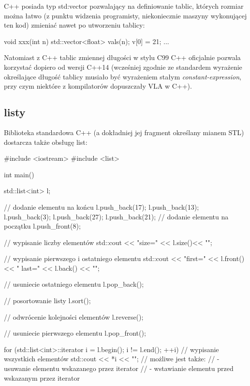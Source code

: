 \documentclass{pdfBooklets}
\begin{document}
C++ posiada typ std:vector pozwalający na definiowanie tablic, których rozmiar można łatwo (z punktu widzenia programisty, niekoniecznie maszyny wykonującej ten kod) zmieniać nawet po utworzeniu tablicy:
\begin{CodeFrame*}[cpp]{}
void xxx(int n) {
    std::vector<float> vals(n);
    v[0] = 21;
    ...
}
\end{CodeFrame*}

Natomiast z C++ tablic zmiennej długości w stylu C99 C++ oficjalnie pozwala korzystać dopiero od wersji C++14 (wcześniej zgodnie ze standardem wyrażenie określające długość tablicy musiało być wyrażeniem stałym \textit{constant-expression}, przy czym niektóre z kompilatorów dopuszczały VLA w C++).

\subsection{listy}

Biblioteka standardowa C++ (a dokładniej jej fragment określany mianem STL) dostarcza także obsługę list:

\begin{CodeFrame*}[cpp]{}
#include <iostream>
#include <list>

int main() {
    std::list<int> l;
    
    // dodanie elementu na końcu
    l.push_back(17);
    l.push_back(13);
    l.push_back(3);
    l.push_back(27);
    l.push_back(21);
    // dodanie elementu na początku
    l.push_front(8);
    
    // wypisanie liczby elementów
    std::cout << "size=" << l.size()<< "\n";
    
    // wypisanie pierwszego i ostatniego elementu
    std::cout << "first=" << l.front() << " last=" << l.back() << "\n";
    
    // usuniecie ostatniego elementu
    l.pop_back();
    
    // posortowanie listy
    l.sort();
    
    // odwrócenie kolejności elementów
    l.reverse();
    
    // usuniecie pierwszego elementu
    l.pop_front();
    
    for (std::list<int>::iterator i = l.begin(); i != l.end(); ++i) {
        // wypisanie wszystkich elementów
        std::cout << *i << "\n";
        // możliwe jest także:
        //  - usuwanie elementu wskazanego przez iterator
        //  - wstawianie elementu przed wskazanym przez iterator
    }
}
\end{CodeFrame*}
\end{document}
